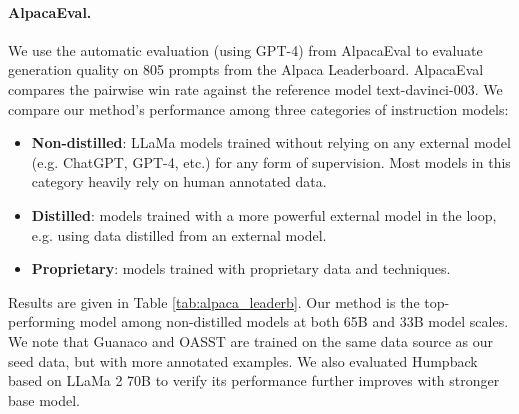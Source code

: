 \paragraph{AlpacaEval.} We use the automatic evaluation (using GPT-4) from AlpacaEval to evaluate generation quality on 805 prompts from the  Alpaca Leaderboard.  AlpacaEval compares the pairwise win rate against the reference model text-davinci-003. We compare our method's performance among three categories of instruction models: 
\begin{itemize}[leftmargin=*]
    \item \textbf{Non-distilled}: LLaMa models trained without relying on any external model (e.g. ChatGPT, GPT-4, etc.) for any form of supervision. Most models in this category heavily rely on human annotated data. 
    \item \textbf{Distilled}: models trained with a more powerful external model in the loop, e.g. using data distilled from an external model.
    \item \textbf{Proprietary}: models trained with proprietary data and techniques. 
\end{itemize}

Results are given in Table \ref{tab:alpaca_leaderb}. Our method is the top-performing model among non-distilled models at both 65B and 33B model scales. We note that Guanaco and OASST are trained on the same data source as our seed data, but with more annotated examples. We also evaluated Humpback based on LLaMa 2 \citep{touvron2023llama2} 70B to verify its performance further improves with stronger base model.


